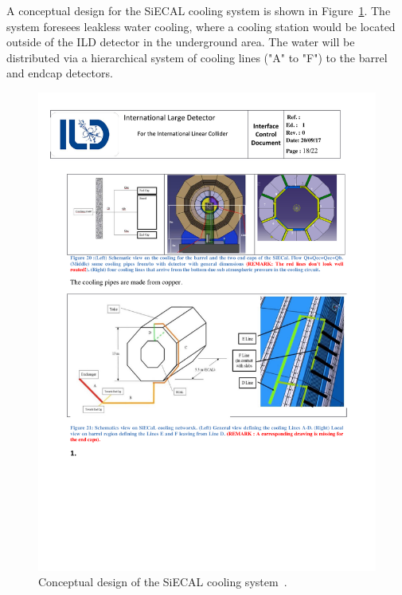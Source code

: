 A conceptual design for the SiECAL cooling system is shown in Figure~\ref{ILD:fig:siecal_cooling}. The system foresees leakless water cooling, where a cooling station would be located outside of the ILD detector in the underground area. The water will be distributed via a hierarchical system of cooling lines ("A" to "F") to the barrel and endcap detectors.

\begin{figure}[h!]
    \centering
        \includegraphics[width=0.8\hsize]{Integration/fig/SiECAL_Cooling.pdf}
    \caption{Conceptual design of the SiECAL cooling system~\cite{ild:bib:SiECAL_ICD}.}
    \label{ILD:fig:siecal_cooling}
\end{figure}

